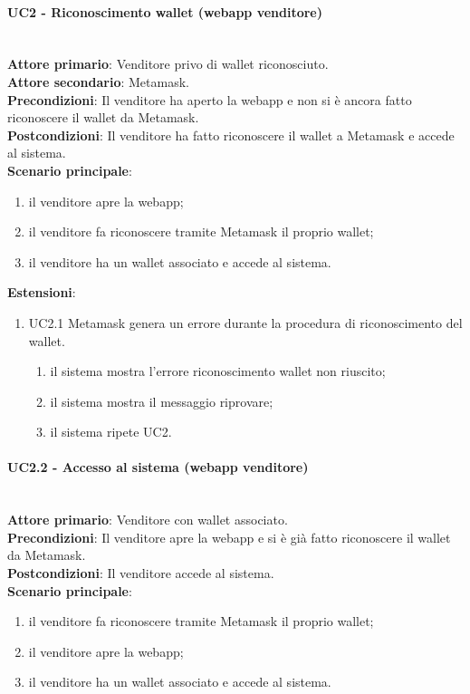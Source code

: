 \documentclass[a4paper, 12pt]{article}
\begin{document}
\paragraph{UC2 - Riconoscimento wallet (webapp venditore)}\\
\textbf{Attore primario}: Venditore privo di wallet riconosciuto.\\
\textbf{Attore secondario}: Metamask.\\
\textbf{Precondizioni}: Il venditore ha aperto la webapp e non si è ancora fatto riconoscere il wallet da Metamask.\\
\textbf{Postcondizioni}: Il venditore ha fatto riconoscere il wallet a Metamask e accede al sistema.\\
\textbf{Scenario principale}:
\begin{enumerate}
    \item il venditore apre la webapp;
    \item il venditore fa riconoscere tramite Metamask il proprio wallet;
    \item il venditore ha un wallet associato e accede al sistema.
\end{enumerate}
\textbf{Estensioni}:
\begin{enumerate}
    \item UC2.1 Metamask genera un errore durante la procedura di riconoscimento del wallet.
    \begin{enumerate}
        \item il sistema mostra l'errore riconoscimento wallet non riuscito;
        \item il sistema mostra il messaggio riprovare;
        \item il sistema ripete UC2.
    \end{enumerate}
\end{enumerate}

\paragraph{UC2.2 - Accesso al sistema (webapp venditore)}\\
\textbf{Attore primario}: Venditore con wallet associato.\\
\textbf{Precondizioni}: Il venditore apre la webapp e si è già fatto riconoscere il wallet da Metamask.\\
\textbf{Postcondizioni}: Il venditore accede al sistema.\\
\textbf{Scenario principale}:
\begin{enumerate}
    \item il venditore fa riconoscere tramite Metamask il proprio wallet;
    \item il venditore apre la webapp;
    \item il venditore ha un wallet associato e accede al sistema.
\end{enumerate}
\end{document}
